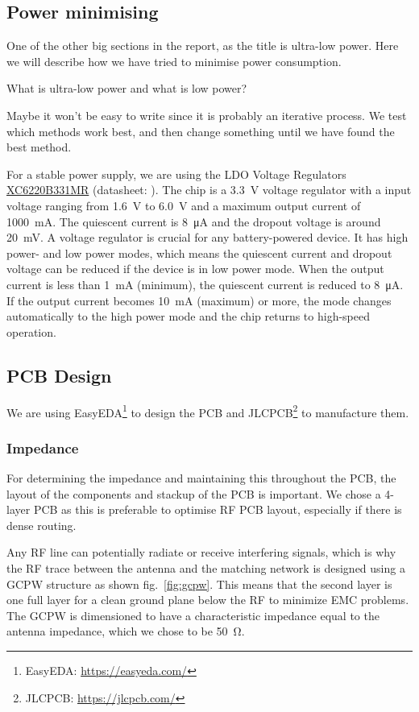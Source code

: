 \subsection{Power minimising}
One of the other big sections in the report, as the title is ultra-low power. Here we will describe how we have tried to minimise power consumption.

What is ultra-low power and what is low power?

Maybe it won't be easy to write since it is probably an iterative process. We test which methods work best, and then change something until we have found the best method.


For a stable power supply, we are using the \ac{LDO} Voltage Regulators \hyperref[bom:xc6220]{XC6220B331MR} (datasheet: ). The chip is a \SI{3.3}{\volt} voltage regulator with a input voltage ranging from \SI{1.6}{\volt} to \SI{6.0}{\volt} and a maximum output current of \SI{1000}{\milli\ampere}. The quiescent current is \SI{8}{\micro\ampere} and the dropout voltage is around \SI{20}{\milli\volt}. A voltage regulator is crucial for any battery-powered device. It has high power- and low power modes, which means the quiescent current and dropout voltage can be reduced if the device is in low power mode. When the output current is less than \SI{1}{\milli\ampere} (minimum), the quiescent current is reduced to \SI{8}{\micro\ampere}. If the output current becomes \SI{10}{\milli\ampere} (maximum) or more, the mode changes automatically to the high power mode and the chip returns to high-speed operation.

\subsection{PCB Design}
We are using EasyEDA\footnote{EasyEDA: \url{https://easyeda.com/}} to design the \ac{PCB} and JLCPCB\footnote{JLCPCB: \url{https://jlcpcb.com/}} to manufacture them.

\subsubsection{Impedance}
For determining the impedance and maintaining this throughout the \ac{PCB}, the layout of the components and stackup of the \ac{PCB} is important. We chose a 4-layer \ac{PCB} as this is preferable to optimise \ac{RF} \ac{PCB} layout, especially if there is dense routing. 

Any \ac{RF} line can potentially radiate or receive interfering signals, which is why the \ac{RF} trace between the antenna and the matching network is designed using a \ac{GCPW} structure as shown fig.~\ref{fig:gcpw}. This means that the second layer is one full layer for a clean ground plane below the \ac{RF} to minimize \ac{EMC} problems. The \ac{GCPW} is dimensioned to have a characteristic impedance equal to the antenna impedance, which we chose to be \SI{50}{\ohm}.


